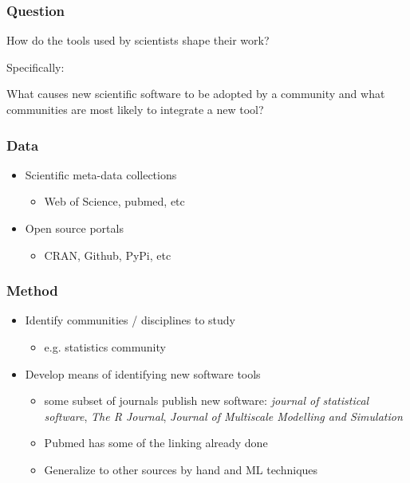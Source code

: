\documentclass{beamer}
\author[]{Reid McIlroy-Young}
\date{April 5, 2017}
\begin{document}
\begin{frame}
  \titlepage
\end{frame}

\begin{frame}
\frametitle{Question}
How do the tools used by scientists shape their work?

Specifically: 
\begin{center}
\Huge What causes new scientific software to be adopted by a community and what communities are most likely to integrate a new tool?
\end{center}

\end{frame}
\begin{frame}
\frametitle{Data}
\begin{itemize}
\item Scientific meta-data collections
	\begin{itemize}
	\item Web of Science, pubmed, etc
	\end{itemize}
\item Open source portals 
	\begin{itemize}
	\item CRAN, Github, PyPi, etc
	\end{itemize}
\end{itemize}
\end{frame}
\begin{frame}
\frametitle{Method}
\begin{itemize}
\item Identify communities / disciplines to study
	\begin{itemize} 
	\item e.g. statistics community
	\end{itemize}
\item Develop means of identifying new software tools
	\begin{itemize}
	\item some subset of journals publish new software: \textit{ journal of statistical software}, \textit{The R Journal}, \textit{Journal of Multiscale Modelling and Simulation}
	\item Pubmed has some of the linking already done
	\item Generalize to other sources by hand and ML techniques
		\end{itemize}
\end{itemize}

\end{frame}
\end{document}
